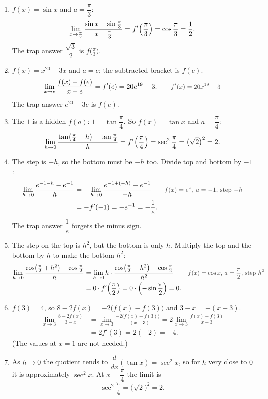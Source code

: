 \documentclass[11pt,a4paper]{article}
\newcounter{example}
\newcommand{\why}[1]{\text{\small\color{darkgray}#1}}
\begin{document}
\begin{examplesolution}
\relax
\begin{enumerate}[label=(\alph*)]
 \item $f(x)=\sin x$ and $a=\dfrac{\pi}{3}$:
 \[
 \lim_{x\to\frac{\pi}{3}}\frac{\sin x-\sin\frac{\pi}{3}}{x-\frac{\pi}{3}}=f'\Bigl(\frac{\pi}{3}\Bigr)=\cos\frac{\pi}{3}=\frac12.
 \]
 The trap answer $\dfrac{\sqrt3}{2}$ is $f\bigl(\frac{\pi}{3}\bigr)$.
 \item $f(x)=x^{20}-3x$ and $a=e$; the subtracted bracket is $f(e)$.
 \[
 \lim_{x\to e}\frac{f(x)-f(e)}{x-e}=f'(e)=20e^{19}-3. \qquad\why{$f'(x)=20x^{19}-3$}
 \]
 The trap answer $e^{20}-3e$ is $f(e)$.
 \item The $1$ is a hidden $f(a)$: $1=\tan\dfrac{\pi}{4}$. So $f(x)=\tan x$ and $a=\dfrac{\pi}{4}$:
 \[
 \lim_{h\to0}\frac{\tan\bigl(\frac{\pi}{4}+h\bigr)-\tan\frac{\pi}{4}}{h}=f'\Bigl(\frac{\pi}{4}\Bigr)=\sec^2\frac{\pi}{4}=\bigl(\sqrt2\bigr)^2=2.
 \]
 \item The step is $-h$, so the bottom must be $-h$ too. Divide top and bottom by $-1$:
 \begin{align*}
 \lim_{h\to0}\frac{e^{-1-h}-e^{-1}}{h}&=-\lim_{h\to0}\frac{e^{-1+(-h)}-e^{-1}}{-h} &&\why{$f(x)=e^x$, $a=-1$, step $-h$}\\
 &=-f'(-1)=-e^{-1}=-\frac1e.
 \end{align*}
 The trap answer $\dfrac1e$ forgets the minus sign.
 \item The step on the top is $h^2$, but the bottom is only $h$. Multiply the top and the bottom by $h$ to make the bottom $h^2$:
 \begin{align*}
 \lim_{h\to0}\frac{\cos\bigl(\frac{\pi}{2}+h^2\bigr)-\cos\frac{\pi}{2}}{h}&=\lim_{h\to0}h\cdot\frac{\cos\bigl(\frac{\pi}{2}+h^2\bigr)-\cos\frac{\pi}{2}}{h^2} &&\why{$f(x)=\cos x$, $a=\dfrac{\pi}{2}$, step $h^2$}\\
 &=0\cdot f'\Bigl(\frac{\pi}{2}\Bigr)=0\cdot\Bigl(-\sin\frac{\pi}{2}\Bigr)=0.
 \end{align*}
 \item $f(3)=4$, so $8-2f(x)=-2\bigl(f(x)-f(3)\bigr)$ and $3-x=-(x-3)$.
 \begin{align*}
 \lim_{x\to3}\frac{8-2f(x)}{3-x}&=\lim_{x\to3}\frac{-2\bigl(f(x)-f(3)\bigr)}{-(x-3)}=2\lim_{x\to3}\frac{f(x)-f(3)}{x-3}\\
 &=2f'(3)=2(-2)=-4.
 \end{align*}
 (The values at $x=1$ are not needed.)
 \item As $h\to0$ the quotient tends to $\dfrac{d}{dx}(\tan x)=\sec^2x$, so for $h$ very close to $0$ it is approximately $\sec^2x$. At $x=\dfrac{\pi}{4}$ the limit is
 \[
 \sec^2\frac{\pi}{4}=\bigl(\sqrt2\bigr)^2=2.
 \]
\end{enumerate}
\end{examplesolution}
\end{document}
